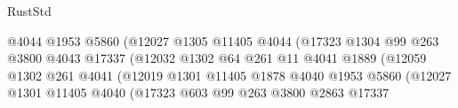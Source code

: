 \begin{lexlean}{RustStd}
\begin{coremodule}
                                                @4044
                                                @1953
                                                @5860
                                                (@12027
                                                  @1305
                                                  @11405
                                                  @4044
                                                  (@17323
                                                    @1304
                                                    @99
                                                    @263
                                                    @3800
                                                    @4043
                                                    @17337
                                                    (@12032
                                                      @1302
                                                      @64
                                                      @261
                                                      @11
                                                      @4041
                                                      @1889
                                                      (@12059
                                                        @1302
                                                        @261
                                                        @4041
                                                        (@12019
                                                          @1301
                                                          @11405
                                                          @1878
                                                          @4040
                                                          @1953
                                                          @5860
                                                          (@12027
                                                            @1301
                                                            @11405
                                                            @4040
                                                            (@17323
                                                              @603
                                                              @99
                                                              @263
                                                              @3800
                                                              @2863
                                                              @17337

\end{coremodule}
\end{lexlean}
